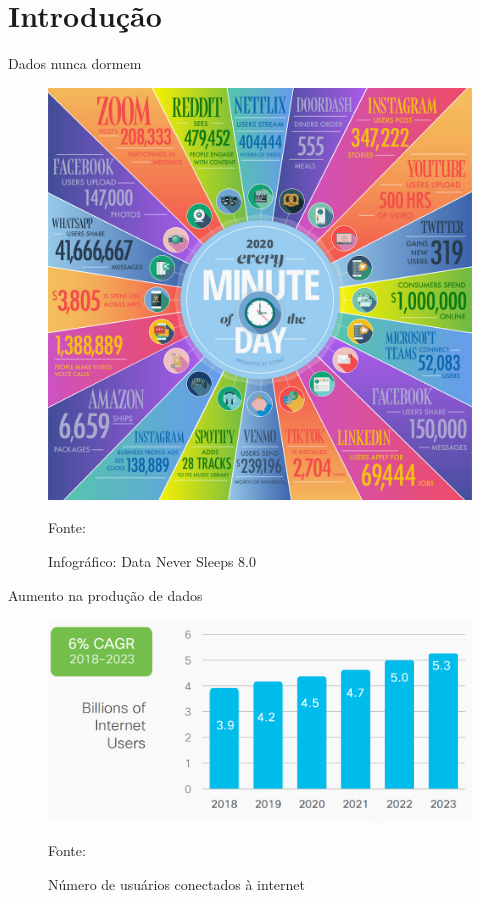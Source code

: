 \section{Introdução}


\begin{frame}{Dados nunca dormem}
    \begin{figure}[h!]
        \centering
        \includegraphics[scale=0.75]{images/data-never-sleeps.jpg}
        
        \caption{Infográfico: Data Never Sleeps 8.0 }
        \footnotesize{Fonte: \cite{data-never-sleeps}}
    \end{figure} 
\end{frame}

\begin{frame}{Aumento na produção de dados}
	\begin{figure}[h!]
        \centering
        \includegraphics[scale=0.2]{images/relatorio-cisco.png}
        
        \caption{Número de usuários conectados à internet}
        \footnotesize{Fonte: \cite{report-cisco}}
    \end{figure} 
\end{frame}


